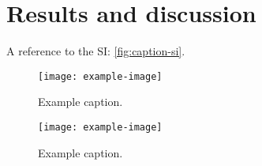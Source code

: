 

\section{Results and discussion}

A reference to the SI: \autoref{fig:caption-si}.

\begin{figure}[htb]
    \centering
    \texttt{[image: example-image]}
    \caption{%
        Example caption.
    }\label{fig:caption-1}
\end{figure}

\lipsum[1-9]{}

\begin{figure*}[htb]
    \centering
    \texttt{[image: example-image]}
    \caption{%
        Example caption.
    }\label{fig:caption-2}
\end{figure*}

\lipsum[2-5]{}